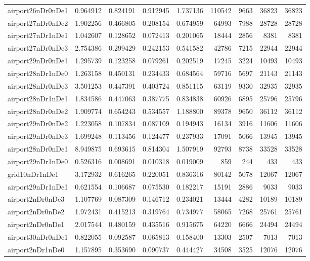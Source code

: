 \begin{longtable}{|l|r|r|r|r|r|r|r|r|}
airport26nDr0nDe1 & 0.964912 & 0.824191 & 0.912945 & 1.737136 & 110542 & 9663 & 36823 & 36823 \\
airport27nDr0nDe2 & 1.902256 & 0.466805 & 0.208154 & 0.674959 & 64993 & 7988 & 28728 & 28728 \\
airport27nDr1nDe1 & 1.042607 & 0.128652 & 0.072413 & 0.201065 & 18444 & 2856 & 8381 & 8381 \\
airport27nDr0nDe3 & 2.754386 & 0.299429 & 0.242153 & 0.541582 & 42786 & 7215 & 22944 & 22944 \\
airport29nDr0nDe1 & 1.295739 & 0.123258 & 0.079261 & 0.202519 & 17245 & 3224 & 10493 & 10493 \\
airport28nDr1nDe0 & 1.263158 & 0.450131 & 0.234433 & 0.684564 & 59716 & 5697 & 21143 & 21143 \\
airport28nDr0nDe3 & 3.501253 & 0.447391 & 0.403724 & 0.851115 & 63119 & 9330 & 32935 & 32935 \\
airport28nDr1nDe1 & 1.834586 & 0.447063 & 0.387775 & 0.834838 & 60926 & 6895 & 25796 & 25796 \\
airport28nDr0nDe2 & 1.909774 & 0.654243 & 0.534557 & 1.188800 & 89378 & 9650 & 36112 & 36112 \\
airport29nDr0nDe2 & 1.223058 & 0.107834 & 0.087109 & 0.194943 & 16134 & 3916 & 11606 & 11606 \\
airport29nDr0nDe3 & 1.699248 & 0.113456 & 0.124477 & 0.237933 & 17091 & 5066 & 13945 & 13945 \\
airport28nDr0nDe1 & 8.949875 & 0.693615 & 0.814304 & 1.507919 & 92793 & 8738 & 33528 & 33528 \\
airport29nDr1nDe0 & 0.526316 & 0.008691 & 0.010318 & 0.019009 & 859 & 244 & 433 & 433 \\
grid10nDr1nDe1 & 3.172932 & 0.616265 & 0.220051 & 0.836316 & 80142 & 5078 & 12067 & 12067 \\
airport29nDr1nDe1 & 0.621554 & 0.106687 & 0.075530 & 0.182217 & 15191 & 2886 & 9033 & 9033 \\
airport2nDr0nDe3 & 1.107769 & 0.087309 & 0.146712 & 0.234021 & 13444 & 4282 & 10189 & 10189 \\
airport2nDr0nDe2 & 1.972431 & 0.415213 & 0.319764 & 0.734977 & 58065 & 7268 & 25761 & 25761 \\
airport2nDr0nDe1 & 2.017544 & 0.480159 & 0.435516 & 0.915675 & 64220 & 6666 & 24494 & 24494 \\
airport30nDr0nDe1 & 0.822055 & 0.092587 & 0.065813 & 0.158400 & 13303 & 2507 & 7013 & 7013 \\
airport2nDr1nDe0 & 1.157895 & 0.353690 & 0.090737 & 0.444427 & 34508 & 3525 & 12076 & 12076 \\

\end{longtable}

